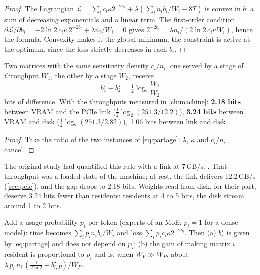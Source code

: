 \begin{proof}
The Lagrangian $\mathcal L = \sum_i c_i \kappa 2^{-2b_i} + \lambda(\sum_i n_i b_i/W_i - 8T)$ is convex in $b$: a sum of decreasing exponentials and a linear term. The first-order condition $\partial\mathcal L/\partial b_i = -2\ln 2\, c_i\kappa\, 2^{-2b_i} + \lambda n_i / W_i = 0$ gives $2^{-2b_i} = \lambda n_i / (2\ln2\, c_i \kappa W_i)$, hence the formula. Convexity makes it the global minimum; the constraint is active at the optimum, since the loss strictly decreases in each $b_i$.
\end{proof}

\begin{corollaire}\label{cor:regle-bits}
Two matrices with the same sensitivity density $c_i/n_i$, one served by a stage of throughput $W_1$, the other by a stage $W_2$, receive
\begin{equation}\label{eq:regle-bits}
b_1^\star - b_2^\star = \tfrac12 \log_2 \frac{W_1}{W_2}
\end{equation}
bits of difference. With the throughputs measured in \cref{ch:machine}: \textbf{2.18 bits} between VRAM and the PCIe link ($\tfrac12\log_2(251.3/12.2)$), \textbf{3.24 bits} between VRAM and disk ($\tfrac12\log_2(251.3/2.82)$), 1.06 bits between link and disk \calc.
\end{corollaire}

\begin{proof}
Take the ratio of the two instances of \cref{eq:partage}: $\lambda$, $\kappa$ and $c_i/n_i$ cancel.
\end{proof}

\noindent The original study had quantified this rule with a link at 7\,GB/s: . That throughput was a loaded state of the machine; at rest, the link delivers 12.2\,GB/s (\cref{sec:pcie}), and the gap drops to 2.18 bits. Weights read from disk, for their part, deserve 3.24 bits fewer than residents: residents at 4 to 5 bits, the disk stream around 1 to 2 bits.

\begin{proposition}\label{prop:frequence}
Add a usage probability $p_i$ per token (experts of an MoE; $p_i = 1$ for a dense model): time becomes $\sum_i p_i n_i b_i/W_i$ and loss $\sum_i p_i c_i \kappa 2^{-2b_i}$. Then (a) $b_i^\star$ is given by \cref{eq:partage} and does not depend on $p_i$; (b) the gain of making matrix $i$ resident is proportional to $p_i$ and is, when $W_V \gg W_P$, about $\lambda\, p_i\, n_i\, (\tfrac{1}{2\ln 2} + b^\star_{i,P})/W_P$.
\end{proposition}

